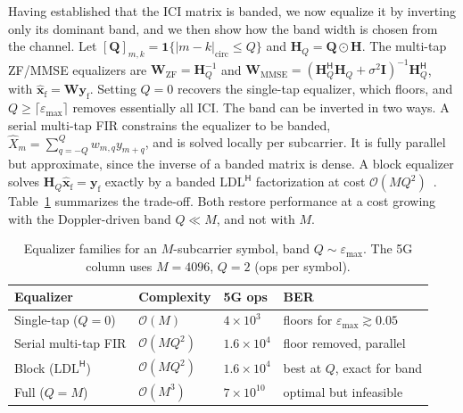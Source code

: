 \documentclass[onecolumn,journal]{IEEEtran}
\theoremstyle{bfhead}
\newcommand{\by}{\bm{y}}
\newcommand{\bH}{\bm{H}}
\newcommand{\bW}{\bm{W}}
\newcommand{\bI}{\bm{I}}
\newcommand{\bQ}{\bm{Q}}
\newcommand{\bhat}[1]{\hat{\bm{#1}}}
\begin{document}
Having established that the ICI matrix is banded, we now equalize it by inverting
only its dominant band, and we then show how the band width is chosen from the
channel. Let $[\bQ]_{m,k}=\mathbf 1\{|m-k|_{\mathrm{circ}}\le Q\}$ and
$\bH_Q=\bQ\odot\bH$. The multi-tap ZF/MMSE equalizers are
$\bW_{\mathrm{ZF}}=\bH_Q^{-1}$ and
$\bW_{\mathrm{MMSE}}=(\bH_Q^{\mathsf H}\bH_Q+\sigma^2\bI)^{-1}\bH_Q^{\mathsf H}$,
with $\bhat{x}_{\mathrm f}=\bW\by_{\mathrm f}$. Setting $Q=0$ recovers the
single-tap equalizer, which floors, and $Q\ge\lceil\varepsilon_{\max}\rceil$
removes essentially all ICI. The band can be inverted in two ways.
A serial multi-tap FIR constrains the equalizer to be banded,
$\hat X_m=\sum_{q=-Q}^{Q} w_{m,q}y_{m+q}$, and is solved locally per subcarrier.
It is fully parallel but approximate, since the inverse of a banded matrix is
dense. A block equalizer solves $\bH_Q\bhat{x}_{\mathrm f}=\by_{\mathrm f}$
exactly by a banded $\mathrm{LDL}^{\mathsf H}$ factorization at cost
$\mathcal O(MQ^2)$~\cite{Rugini2005,Rugini2006}. Table~\ref{tab:cx} summarizes the
trade-off. Both restore performance at a cost growing with the Doppler-driven
band $Q\ll M$, and not with $M$.

\begin{table}[!ht]
\centering
\caption{Equalizer families for an $M$-subcarrier symbol, band $Q\sim\varepsilon_{\max}$.
The 5G column uses $M{=}4096$, $Q{=}2$ (ops per symbol).}
\label{tab:cx}
\renewcommand{\arraystretch}{1.25}
\begin{tabular}{@{}l l l l@{}}
\toprule
Equalizer & Complexity & 5G ops & BER\\
\midrule
Single-tap ($Q{=}0$)         & $\mathcal O(M)$      & $4\!\times\!10^{3}$   & floors for $\varepsilon_{\max}\gtrsim0.05$\\
Serial multi-tap FIR         & $\mathcal O(MQ^2)$   & $1.6\!\times\!10^{4}$ & floor removed, parallel\\
Block ($\mathrm{LDL}^{\mathsf H}$) & $\mathcal O(MQ^2)$ & $1.6\!\times\!10^{4}$ & best at $Q$, exact for band\\
Full ($Q{=}M$)               & $\mathcal O(M^3)$    & $7\!\times\!10^{10}$  & optimal but infeasible\\
\bottomrule
\end{tabular}
\end{table}
\end{document}
